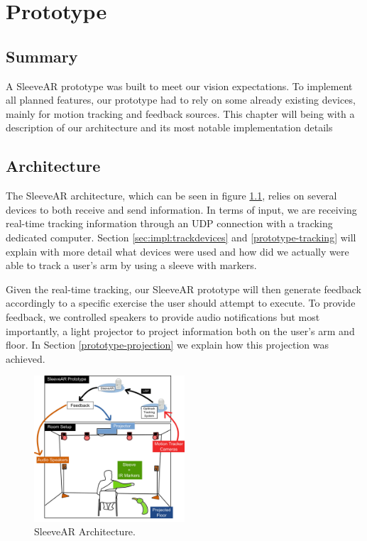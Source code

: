 \chapter{Prototype}
\label{sec:implementation}

\section*{Summary}
A SleeveAR prototype was built to meet our vision expectations. To implement all planned features, our prototype had to rely on some already existing devices, mainly for motion tracking and feedback sources. This chapter will being with a description of our architecture and its most notable implementation details






\section{Architecture}
\label{sec:impl:arch}

The SleeveAR architecture, which can be seen in figure \ref{fig:arch}, relies on several devices to both receive and send information.
In terms of input, we are receiving real-time tracking information through an UDP connection with a tracking dedicated computer. Section \ref{sec:impl:trackdevices} and \ref{prototype-tracking} will explain with more detail what devices were used and how did we actually were able to track a user's arm by using a sleeve with markers.

Given the real-time tracking, our SleeveAR prototype will then generate feedback accordingly to a specific exercise the user should attempt to execute. To provide feedback, we controlled speakers to provide audio notifications but most importantly, a light projector to project information both on the user's arm and floor. In Section \ref{prototype-projection} we explain how this projection was achieved.

\begin{figure}[!t]
    \begin{center}
        \includegraphics[width=0.5\textwidth]{imgs/impl/arch.jpg}
    \end{center}
    \caption{SleeveAR Architecture.}
    \label{fig:arch}
\end{figure}




